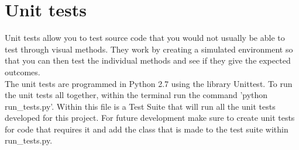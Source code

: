 \documentclass{article}
\begin{document}
    \section{Unit tests}
Unit tests allow you to test source code that you would not usually be able to test through visual methods. They work by creating a simulated environment so that you can then test the individual methods and see if they give the expected outcomes.\\ \newline
The unit tests are programmed in Python 2.7 using the library Unittest\cite{Unittest}. To run the unit tests all together, within the terminal run the command 'python run\_tests.py'. Within this file is a Test Suite that will run all the unit tests developed for this project. For future development make sure to create unit tests for code that requires it and add the class that is made to the test suite within run\_tests.py.
\\ \newline
\end{document}
